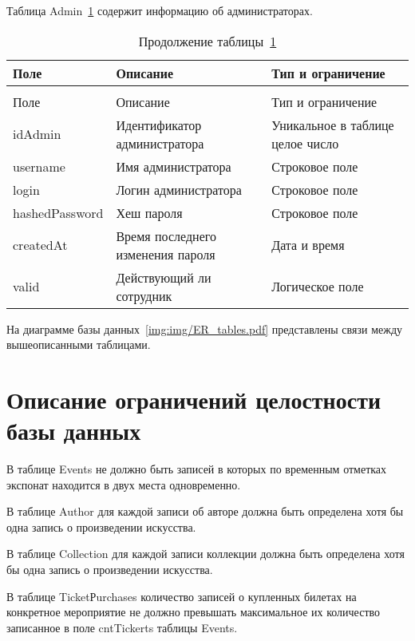 Таблица Admin~\ref{tbl:Admin} содержит информацию об администраторах.

\begin{longtable}{|
		>{\centering\arraybackslash}m{}|
		>{\centering\arraybackslash}m{}|
		>{\centering\arraybackslash}m{}|
	}
	\caption{Таблица сотрудников~(Admin)}\label{tbl:Admin} \\\hline
	Поле & Описание & Тип и ограничение  \\\hline    
	\endfirsthead
	\caption*{Продолжение таблицы~\ref{tbl:Admin} } \\\hline
	Поле & Описание & Тип и ограничение  \\\hline           
	\endhead
	\endfoot
	idAdmin & Идентификатор администратора & Уникальное в таблице целое число \\\hline
	username  & Имя администратора & Строковое поле \\\hline
	login & Логин администратора & Строковое поле \\\hline
	hashedPassword & Хеш пароля & Строковое поле \\\hline
	createdAt & Время последнего изменения пароля & Дата и время \\\hline
	valid & Действующий ли сотрудник & Логическое поле \\\hline
\end{longtable}

На диаграмме базы данных~\ref{img:img/ER_tables.pdf} представлены связи между вышеописанными таблицами.

\FloatBarrier
{}
\FloatBarrier

\section{Описание ограничений целостности базы данных}

В таблице Events не должно быть записей в которых по временным отметках экспонат находится в двух места одновременно.

В таблице Author для каждой записи об авторе должна быть определена хотя бы одна запись о произведении искусства.

В таблице Collection для каждой записи коллекции должна быть определена хотя бы одна запись о произведении искусства.

В таблице TicketРurchases количество записей о купленных билетах на конкретное мероприятие не должно превышать максимальное их количество записанное в поле cntTickerts таблицы Events.

